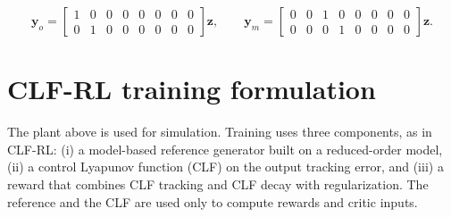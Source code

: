 \begin{equation}
\mathbf{y}_o =
\begin{bmatrix} 1 & 0 & 0 & 0 & 0 & 0 & 0 & 0 \\
                0 & 1 & 0 & 0 & 0 & 0 & 0 & 0 \end{bmatrix} \mathbf{z},
\qquad
\mathbf{y}_m =
\begin{bmatrix} 0 & 0 & 1 & 0 & 0 & 0 & 0 & 0 \\
                0 & 0 & 0 & 1 & 0 & 0 & 0 & 0 \end{bmatrix} \mathbf{z}.
\end{equation}

\section*{CLF-RL training formulation}
The plant above is used for simulation. Training uses three components, as in CLF-RL:
(i) a model-based reference generator built on a reduced-order model,
(ii) a control Lyapunov function (CLF) on the output tracking error, and
(iii) a reward that combines CLF tracking and CLF decay with regularization.
The reference and the CLF are used only to compute rewards and critic inputs.

